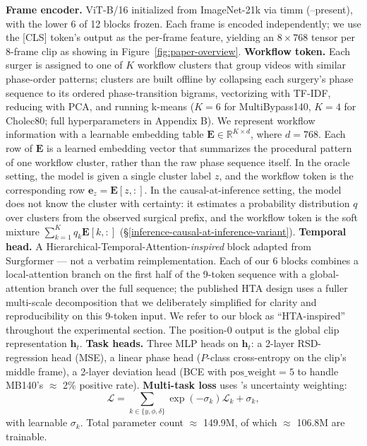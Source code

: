 \textbf{Frame encoder.} ViT-B/16 \citep{dosovitskiy2021vit} initialized
from ImageNet-21k via timm (\citealt{wightman2019timm}--present), with the lower 6
of 12 blocks frozen. Each frame is encoded independently; we use the
{[}CLS{]} token's output as the per-frame feature, yielding an
\(8 \times 768\) tensor per 8-frame clip as showing in Figure~\ref{fig:paper-overview}. \textbf{Workflow token.} Each surger
is assigned to one of \(K\) workflow clusters that group videos with
similar phase-order patterns; clusters are built offline by collapsing
each surgery's phase sequence to its ordered phase-transition bigrams,
vectorizing with TF-IDF, reducing with PCA, and running k-means
(\(K = 6\) for MultiBypass140, \(K = 4\) for Cholec80; full
hyperparameters in Appendix B). We represent workflow information with a
learnable embedding table \(\mathbf{E} \in
\mathbb{R}^{K \times d}\), where \(d = 768\). Each row of \(\mathbf{E}\)
is a learned embedding vector that summarizes the procedural pattern of
one workflow cluster, rather than the raw phase sequence itself. In the
oracle setting, the model is given a single cluster label \(z\), and the
workflow token is the corresponding row
\(\mathbf{e}_z = \mathbf{E}[z, :]\). In the causal-at-inference setting,
the model does not know the cluster with certainty: it estimates a
probability distribution \(q\) over clusters from the observed surgical
prefix, and the workflow token is the soft mixture
\(\sum_{k=1}^K q_k \mathbf{E}[k, :]\)
(\S\ref{inference-causal-at-inference-variant}). \textbf{Temporal head.} A
Hierarchical-Temporal-Attention-\emph{inspired} block adapted from
Surgformer \citep{yang2024surgformer} --- not a verbatim reimplementation. Each
of our 6 blocks combines a local-attention branch on the first half of
the 9-token sequence with a global-attention branch over the full
sequence; the published HTA design uses a fuller multi-scale
decomposition that we deliberately simplified for clarity and
reproducibility on this 9-token input. We refer to our block as
``HTA-inspired'' throughout the experimental section. The position-0
output is the global clip representation \(\mathbf{h}_t\). \textbf{Task
heads.} Three MLP heads on \(\mathbf{h}_t\): a 2-layer RSD-regression
head (MSE), a linear phase head (\(P\)-class cross-entropy on the clip's
middle frame), a 2-layer deviation head (BCE with
\(\text{pos\_weight} = 5\) to handle MB140's $\approx$ 2\% positive rate).
\textbf{Multi-task loss} uses \citet{kendall2018multitask}'s uncertainty
weighting: \[
\mathcal{L} = \sum_{k \in \{y, \phi, \delta\}} \exp(-\sigma_k) \mathcal{L}_k + \sigma_k,
\] with learnable \(\sigma_k\). Total parameter count $\approx$ 149.9M, of which
$\approx$ 106.8M are trainable.

